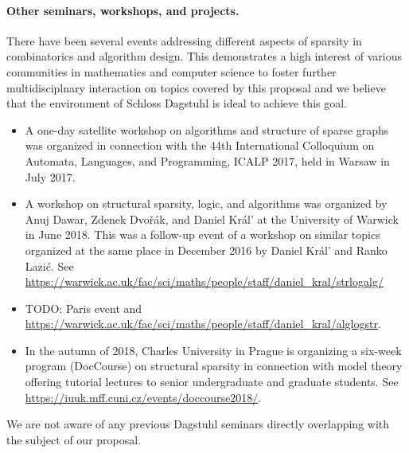 \paragraph*{Other seminars, workshops, and projects.}
There have been several events addressing different aspects of sparsity in combinatorics and algorithm design.
This demonstrates a high interest of various communities in mathematics and computer science
to foster further multidisciplnary interaction on topics covered by this proposal and
we believe that the environment of Schloss Dagstuhl is ideal to achieve this goal.
\begin{itemize}
\item A one-day satellite workshop on algorithms and structure of sparse graphs was organized in connection with the 44th International Colloquium on Automata, Languages, and Programming, ICALP 2017, held in Warsaw in July 2017.
\item A workshop on structural sparsity, logic, and algorithms was organized by Anuj Dawar, Zdenek Dvo\v{r}\'ak, and Daniel Kr\'al' at the University of Warwick in June 2018. This was a follow-up event of a workshop on similar topics organized at the same place in December 2016 by Daniel Kr\'al' and Ranko Lazi\'c. See \url{https://warwick.ac.uk/fac/sci/maths/people/staff/daniel_kral/strlogalg/}
\item TODO: Paris event
and \url{https://warwick.ac.uk/fac/sci/maths/people/staff/daniel_kral/alglogstr}.
\item In the autumn of 2018, Charles University in Prague is organizing a six-week program (DocCourse) on structural sparsity in connection with model theory offering tutorial lectures to senior undergraduate and graduate students. See \url{https://iuuk.mff.cuni.cz/events/doccourse2018/}.
\end{itemize}
We are not aware of any previous Dagstuhl seminars directly overlapping with the subject of our proposal.
